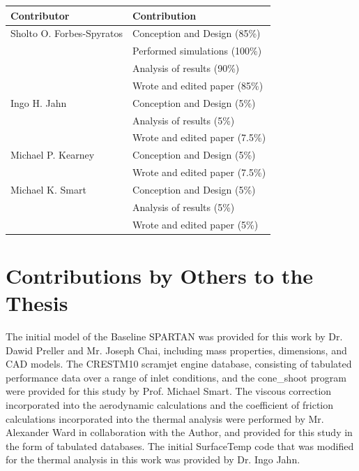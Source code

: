 \begin{center}
  \begin{tabular}{ll}
    \toprule
    Contributor   & Contribution \\
    \midrule
    Sholto O. Forbes-Spyratos             
                                  & Conception and Design (85\%)\\
                                  & Performed simulations (100\%)\\
                                  & Analysis of results (90\%)\\
                                  & Wrote and edited paper (85\%)\\
    \midrule
    Ingo H. Jahn            
                                  & Conception and Design (5\%)\\
                                  & Analysis of results (5\%)\\
                                  & Wrote and edited paper (7.5\%)\\
                                  
        \midrule
        Michael P. Kearney            
								      & Conception and Design (5\%)\\
								      & Wrote and edited paper (7.5\%)\\                       

    \midrule
    Michael K. Smart              
                                  & Conception and Design (5\%)\\
                                  & Analysis of results (5\%)\\
                                  & Wrote and edited paper (5\%)\\
    \bottomrule
  \end{tabular}
\end{center}



\section*{Contributions by Others to the Thesis}

The initial model of the Baseline SPARTAN was provided for this work by Dr. Dawid Preller and Mr. Joseph Chai, including mass properties, dimensions, and CAD models. The \textsf{CRESTM10} scramjet engine database, consisting of tabulated performance data over a range of inlet conditions, and the \textsf{cone\_shoot} program were provided for this study by Prof. Michael Smart. The viscous correction incorporated into the aerodynamic calculations and the coefficient of friction calculations incorporated into the thermal analysis were performed by Mr. Alexander Ward in collaboration with the Author, and provided for this study in the form of tabulated databases. The initial \textsf{SurfaceTemp} code that was modified for the thermal analysis in this work was provided by Dr. Ingo Jahn. 



